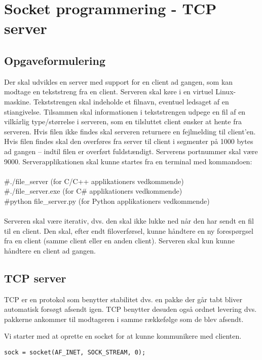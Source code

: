 \chapter{Socket programmering - TCP server}

\section{Opgaveformulering}

Der skal udvikles en server med support for en client ad gangen, som kan modtage
en tekststreng fra en client. Serveren skal køre i en virtuel Linux-maskine.
Tekststrengen skal indeholde et filnavn, eventuel ledsaget af en stiangivelse.
Tilsammen skal informationen i tekststrengen udpege en fil af en vilkårlig
type/størrelse i serveren, som en tilsluttet client ønsker at hente fra serveren. Hvis
filen ikke findes skal serveren returnere en fejlmelding til client’en. Hvis filen findes
skal den overføres fra server til client i segmenter på 1000 bytes ad gangen – indtil
filen er overført fuldstændigt. Serverens portnummer skal være 9000. Serverapplikationen
skal kunne startes fra en terminal med kommandoen:\\ \\
\#./file\_server (for C/C++ applikationers vedkommende)\\
\#./file\_server.exe (for C\# applikationers vedkommende)\\
\#python file\_server.py (for Python applikationers vedkommende)\\ \\
Serveren skal være iterativ, dvs. den skal ikke lukke ned når den har sendt en fil til en
client. Den skal, efter endt filoverførsel, kunne håndtere en ny forespørgsel fra en
client (samme client eller en anden client).
Serveren skal kun kunne håndtere en client ad gangen.

\section{TCP server}

TCP er en protokol som benytter stabilitet dvs. en pakke der går tabt bliver automatisk forsøgt afsendt igen. TCP benytter desuden også ordnet levering dvs. pakkerne ankommer til modtageren i samme rækkefølge som de blev afsendt.

Vi starter med at oprette en socket for at kunne kommunikere med clienten. \\

\begin{lstlisting}
sock = socket(AF_INET, SOCK_STREAM, 0);
\end{lstlisting}

